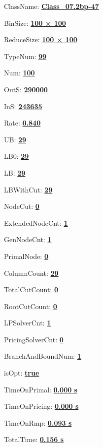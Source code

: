 \documentclass[11pt]{article}
\begin{document}
\pagestyle{empty}


ClassName: \underline{\textbf{Class_07.2bp-47}}
\par
BinSize: \underline{\textbf{100 × 100}}
\par
ReduceSize: \underline{\textbf{100 × 100}}
\par
TypeNum: \underline{\textbf{99}}
\par
Num: \underline{\textbf{100}}
\par
OutS: \underline{\textbf{290000}}
\par
InS: \underline{\textbf{243635}}
\par
Rate: \underline{\textbf{0.840}}
\par
UB: \underline{\textbf{29}}
\par
LB0: \underline{\textbf{29}}
\par
LB: \underline{\textbf{29}}
\par
LBWithCut: \underline{\textbf{29}}
\par
NodeCut: \underline{\textbf{0}}
\par
ExtendedNodeCnt: \underline{\textbf{1}}
\par
GenNodeCnt: \underline{\textbf{1}}
\par
PrimalNode: \underline{\textbf{0}}
\par
ColumnCount: \underline{\textbf{29}}
\par
TotalCutCount: \underline{\textbf{0}}
\par
RootCutCount: \underline{\textbf{0}}
\par
LPSolverCnt: \underline{\textbf{1}}
\par
PricingSolverCnt: \underline{\textbf{0}}
\par
BranchAndBoundNum: \underline{\textbf{1}}
\par
isOpt: \underline{\textbf{true}}
\par
TimeOnPrimal: \underline{\textbf{0.000 s}}
\par
TimeOnPricing: \underline{\textbf{0.000 s}}
\par
TimeOnRmp: \underline{\textbf{0.093 s}}
\par
TotalTime: \underline{\textbf{0.156 s}}
\par
\newpage


\end{document}
